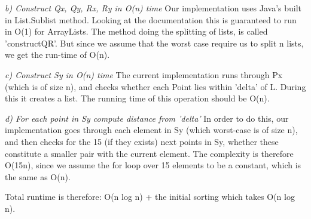 \documentclass{tufte-handout}
\begin{document}
\emph{b) Construct Qx, Qy, Rx, Ry in O(n) time } \linebreak
Our implementation uses Java's built in List.Sublist method. Looking at the documentation this is guaranteed to run in O(1) for ArrayLists. 
The method doing the splitting of lists, is called 'constructQR'. But since we assume that the worst case require us to split n lists,
we get the run-time of O(n).

\bigskip
\emph{c) Construct Sy in O(n) time} \linebreak
The current implementation runs through Px (which is of size n), and checks whether each Point lies within 'delta' of L. During this it 
creates a list. The running time of this operation should be O(n). 

\bigskip
\emph{d) For each point in Sy compute distance from 'delta'} \linebreak
In order to do this, our implementation goes through each element in Sy (which worst-case is of size n), 
and then checks for the 15 (if they exists) next points in Sy, whether these constitute a smaller pair with the current element. 
The complexity is therefore O(15n), since we assume the for loop over 15 elements to be a constant, which is the same as O(n).

\bigskip
Total runtime is therefore: O(n log n) + the initial sorting which takes O(n log n).
\end{document}
